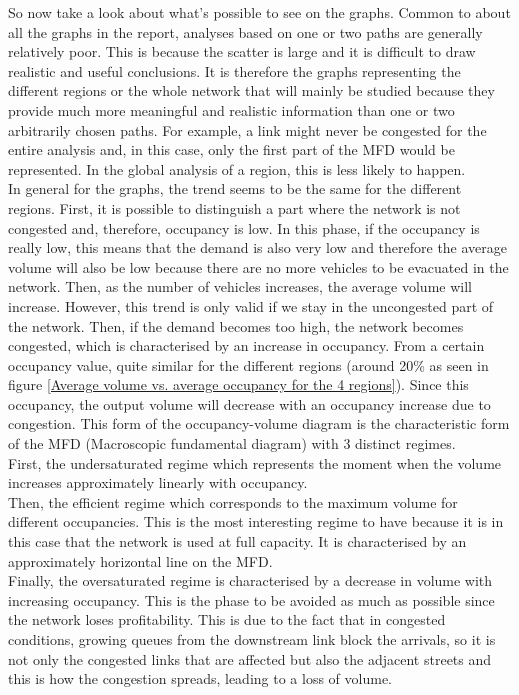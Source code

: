 \documentclass[a4paper, 12pt,oneside]{article}
\begin{document}
So now take a look about what's possible to see on the graphs. Common to about all the graphs in the report, analyses based on one or two paths are generally relatively poor. This is because the scatter is large and it is difficult to draw realistic and useful conclusions. It is therefore the graphs representing the different regions or the whole network that will mainly be studied because they provide much more meaningful and realistic information than one or two arbitrarily chosen paths. For example, a link might never be congested for the entire analysis and, in this case, only the first part of the MFD would be represented. In the global analysis of a region, this is less likely to happen.\\
In general for the graphs, the trend seems to be the same for the different regions. First, it is possible to distinguish a part where the network is not congested and, therefore, occupancy is low. In this phase, if the occupancy is really low, this means that the demand is also very low and therefore the average volume will also be low because there are no more vehicles to be evacuated in the network. Then, as the number of vehicles increases, the average volume will increase. However, this trend is only valid if we stay in the uncongested part of the network. Then, if the demand becomes too high, the network becomes congested, which is characterised by an increase in occupancy. From a certain occupancy value, quite similar for the different regions (around 20\% as seen in figure \ref{Average volume vs. average occupancy for the 4 regions}). Since this occupancy, the output volume will decrease with an occupancy increase due to congestion.
\smallbreak
This form of the occupancy-volume diagram is the characteristic form of the MFD (Macroscopic fundamental diagram) with 3 distinct regimes.\\ 
First, the undersaturated regime which represents the moment when the volume increases approximately linearly with occupancy.\\
Then, the efficient regime which corresponds to the maximum volume for different occupancies. This is the most interesting regime to have because it is in this case that the network is used at full capacity. It is characterised by an approximately horizontal line on the MFD.\\ 
Finally, the oversaturated regime is characterised by a decrease in volume with increasing occupancy. This is the phase to be avoided as much as possible since the network loses profitability. This is due to the fact that in congested conditions, growing queues from the downstream link block the arrivals, so it is not only the congested links that are affected but also the adjacent streets and this is how the congestion spreads, leading to a loss of volume.
\end{document}
